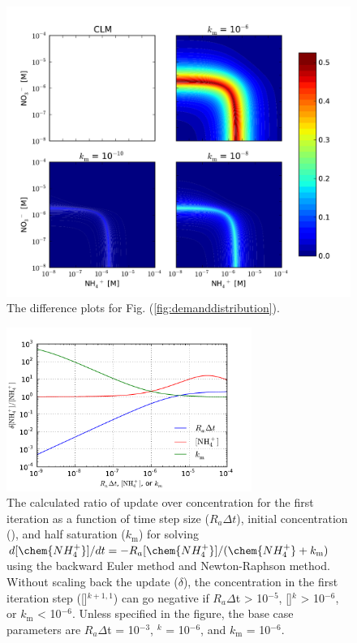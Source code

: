 \documentclass[gmd, manuscript]{copernicus}
\begin{document}
\begin{figure}[t]
\includegraphics[width=12cm]{../figs/fig06/uptaked.pdf}
\caption{The difference plots for Fig. (\ref{fig:demanddistribution}).}
\label{fig:demanddistributiondiff}
\end{figure}

\begin{figure}[t]
\includegraphics[width=8cm]{../figs/fig07/fig07monodupdate1.pdf}
\caption{The calculated ratio of update over concentration for the first
iteration as a function of time step size ($R_a \Delta t$), initial
concentration (), and half saturation ($k_\text{m}$) for solving
$d[\chem{NH_4^+}]/dt=-R_a[\chem{NH_4^+}]/(\chem{NH_4^+} + k_\text{m})$ using
the backward Euler method and Newton-Raphson method. Without scaling back the
update ($\delta$), the concentration in the first iteration step
([]$^{k+1,1}$) can go negative if $R_a \Delta$t > 10$^{-5}$,
[]$^k$ > 10$^{-6}$, or $k_\text{m}$ < 10$^{-6}$. Unless specified in
the figure, the base case parameters are $R_a \Delta$t = 10$^{-3}$,
$^k$ = 10$^{-6}$, and $k_\text{m}$ = 10$^{-6}$.}
\label{fig:monodupdate}
\end{figure}
\end{document}
